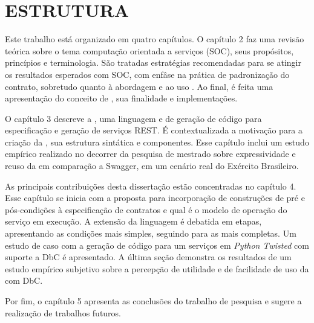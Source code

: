 \section{ESTRUTURA}
\vspace{-6mm}

Este trabalho está organizado em quatro capítulos. O capítulo 2 faz uma revisão
teórica sobre o tema computação orientada a serviços (SOC), seus propósitos,
princípios e terminologia. São tratadas estratégias recomendadas para se
atingir os resultados esperados com SOC, com enfâse na prática de padronização
do contrato, sobretudo quanto à abordagem \CtFirst{} e ao uso \wss{}. Ao final,
é feita uma apresentação do conceito de \designbycontract{}, sua finalidade e
implementações.

O capítulo 3 descreve a \neoidl{}, uma linguagem e \framework{} de geração de
código para especificação e geração de serviços REST. É contextualizada a
motivação para a criação da \neoidl{}, sua estrutura sintática e componentes.
Esse capítulo inclui um estudo empírico realizado no decorrer da pesquisa
de mestrado sobre expressividade e reuso da \neoidl{} em comparação a Swagger,
em um cenário real do Exército Brasileiro.

As principais contribuições desta dissertação estão concentradas no capítulo 4.
Esse capítulo se inicia com a proposta para incorporação de construções de pré e
pós-condições à especificação de contratos e qual é o modelo de operação do
serviço em execução. A extensão da linguagem é debatida em etapas, apresentando
as condições mais simples, seguindo para as mais completas. Um estudo de caso
com a geração de código para um serviços em \textit{Python Twisted} com suporte
a DbC é apresentado. A última seção demonstra os resultados de um estudo
empírico subjetivo sobre a percepção de utilidade e de facilidade de uso da \neoidl{} com DbC.

Por fim, o capítulo 5 apresenta as conclusões do trabalho de pesquisa e sugere a
reali\-zação de trabalhos futuros.
